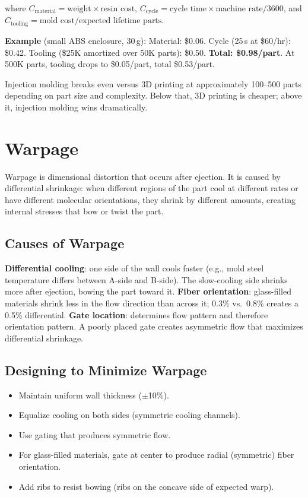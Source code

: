 where $C_{\text{material}} = \text{weight} \times \text{resin cost}$, $C_{\text{cycle}} = \text{cycle time} \times \text{machine rate} / 3600$, and $C_{\text{tooling}} = \text{mold cost} / \text{expected lifetime parts}$.

\textbf{Example} (small ABS enclosure, 30\,g): Material: \$0.06. Cycle (25\,s at \$60/hr): \$0.42. Tooling (\$25K amortized over 50K parts): \$0.50. \textbf{Total: \$0.98/part}. At 500K parts, tooling drops to \$0.05/part, total \$0.53/part.

Injection molding breaks even versus 3D printing at approximately 100--500 parts depending on part size and complexity. Below that, 3D printing is cheaper; above it, injection molding wins dramatically.




\section{Warpage}
Warpage is dimensional distortion that occurs after ejection. It is caused by differential shrinkage: when different regions of the part cool at different rates or have different molecular orientations, they shrink by different amounts, creating internal stresses that bow or twist the part.

\subsection{Causes of Warpage}
\textbf{Differential cooling}: one side of the wall cools faster (e.g., mold steel temperature differs between A-side and B-side). The slow-cooling side shrinks more after ejection, bowing the part toward it. \textbf{Fiber orientation}: glass-filled materials shrink less in the flow direction than across it; 0.3\% vs.\ 0.8\% creates a 0.5\% differential. \textbf{Gate location}: determines flow pattern and therefore orientation pattern. A poorly placed gate creates asymmetric flow that maximizes differential shrinkage.

\subsection{Designing to Minimize Warpage}
\begin{itemize}[nosep,leftmargin=1.5em]
\item Maintain uniform wall thickness ($\pm$10\%).
\item Equalize cooling on both sides (symmetric cooling channels).
\item Use gating that produces symmetric flow.
\item For glass-filled materials, gate at center to produce radial (symmetric) fiber orientation.
\item Add ribs to resist bowing (ribs on the concave side of expected warp).
\end{itemize}

